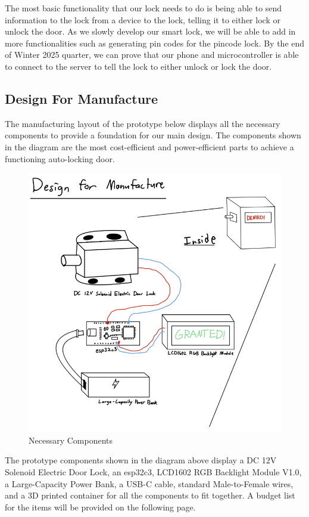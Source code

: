 The most basic functionality that our lock needs to do is being able to send information to the lock from a device to the lock, telling it to either lock or unlock the door. As we slowly develop our smart lock, we will be able to add in more functionalities such as generating pin codes for the pincode lock. By the end of Winter 2025 quarter, we can prove that our phone and microcontroller is able to connect to the server to tell the lock to either unlock or lock the door.

\newpage
\subsection{Design For Manufacture} \label{DesignForManufacture}

The manufacturing layout of the prototype below displays all the necessary components to provide a foundation for our main design. The components shown in the diagram are the most cost-efficient and power-efficient parts to achieve a functioning auto-locking door.

\begin{figure}[!ht]
    \centering
    \includegraphics[width=0.85\linewidth]{./img/DFM.png}
    \caption{Necessary Components}
    \label{fig:enter-label}
\end{figure}

The prototype components shown in the diagram above display a DC 12V Solenoid Electric Door Lock, an esp32c3, LCD1602 RGB Backlight Module V1.0, a Large-Capacity Power Bank, a USB-C cable, standard Male-to-Female wires, and a 3D printed container for all the components to fit together. A budget list for the items will be provided on the following page.

\newpage
